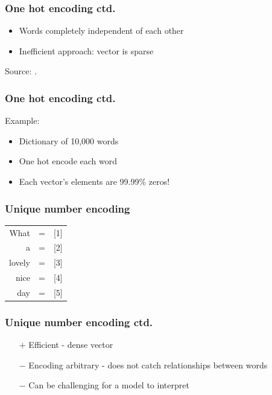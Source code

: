 \begin{frame}
\frametitle{One hot encoding ctd.}

	\begin{itemize}
		\item Words completely independent of each other
		\item Inefficient approach: vector is sparse
	\end{itemize}

\tiny Source: .

\end{frame}

\begin{frame}
\frametitle{One hot encoding ctd.}

	Example:
	\begin{itemize}
		\item Dictionary of 10,000 words
		\item One hot encode each word
		\item Each vector's elements are 99.99\% zeros!
		
	\end{itemize}

\end{frame}

\begin{frame}
\frametitle{Unique number encoding}

\begin{table}[h]
	\hspace{15mm}
	\huge
	\begin{tabular}{rcl}
		What & = & [1] \\
		a & = & [2]\\
		lovely & = & [3]\\
		nice & = & [4]\\
		day & = & [5]\\
	\end{tabular}
\end{table}


\end{frame}

\begin{frame}
\frametitle{Unique number encoding ctd.}

	\begin{itemize}
		\item[$+$] Efficient - dense vector
		\item[$-$] Encoding arbitrary - does not catch relationships between words
		\item[$-$] Can be challenging for a model to interpret
	\end{itemize}

\end{frame}

